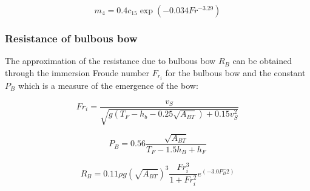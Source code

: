\begin{equation}
    \label{eqn:m4}
    m_4 = 0.4 c_{15} \exp{(-0.034Fr^{-3.29})}
\end{equation}

\subsubsection*{Resistance of bulbous bow}

The approximation of the resistance due to bulbous bow $R_B$ can be obtained through the immersion Froude number $F_{r_i}$ for the bulbous bow and the constant $P_B$ which is a measure of the emergence of the bow: 

\begin{equation}
    \label{Fr_immersion}
    Fr_i = \frac{v_S}{\sqrt{g(T_F-h_b-0.25 \sqrt{A_{BT}})+0.15v_S^2}}
\end{equation}

\begin{equation}
    \label{Pb}
    P_B = 0.56 \frac{\sqrt{A_{BT}}}{T_F-1.5h_B+h_F}
\end{equation}

\begin{equation}
    \label{eqn:Rbulb}
    R_B = 0.11 \rho g (\sqrt{A_{BT}})^3 \frac{Fr_{i}^3}{1+Fr_{i}^2}e^{(-3.0P_B^-2)}
\end{equation}

